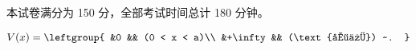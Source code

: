 
本试卷满分为 150 分，全部考试时间总计 180 分钟。

\begin{equation}
V(x) = \leftgroup{
&0 && (0 < x < a)\\
&+\infty && (\text{其他}) ~.
}\end{equation}
